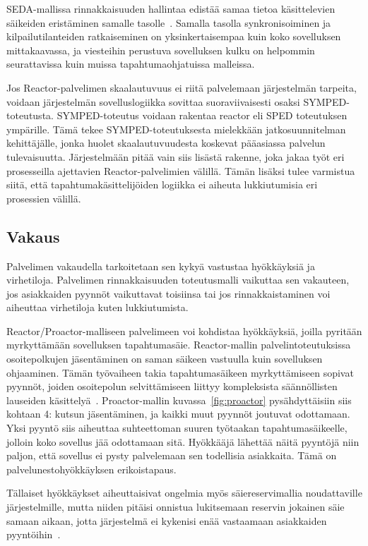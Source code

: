 \documentclass[finnish]{tktltiki2}
\theoremstyle{definition}
\theoremstyle{remark}
\begin{document}
SEDA-mallissa rinnakkaisuuden hallintaa edistää
samaa tietoa käsittelevien säikeiden eristäminen samalle tasolle~\cite{welsh_seda_2001}.
Samalla tasolla synkronisoiminen ja kilpailutilanteiden ratkaiseminen on
yksinkertaisempaa kuin koko sovelluksen mittakaavassa, ja
viesteihin perustuva sovelluksen kulku on helpommin seurattavissa kuin
muissa tapahtumaohjatuissa malleissa.

Jos Reactor-palvelimen skaalautuvuus ei riitä palvelemaan
järjestelmän tarpeita, voidaan järjestelmän sovelluslogiikka
sovittaa suoraviivaisesti osaksi SYMPED-toteutusta. SYMPED-toteutus
voidaan rakentaa reactor eli SPED toteutuksen ympärille. Tämä
tekee SYMPED-toteutuksesta mielekkään jatkosuunnitelman kehittäjälle,
jonka huolet skaalautuvuudesta koskevat pääasiassa palvelun tulevaisuutta.
Järjestelmään pitää vain siis lisästä rakenne, joka
jakaa työt eri prosesseilla ajettavien Reactor-palvelimien välillä.
Tämän lisäksi tulee varmistua siitä, että tapahtumakäsittelijöiden
logiikka ei aiheuta lukkiutumisia eri prosessien välillä.

\subsection{Vakaus}
Palvelimen vakaudella tarkoitetaan sen kykyä vastustaa hyökkäyksiä ja
virhetiloja.
Palvelimen rinnakkaisuuden toteutusmalli vaikuttaa sen vakauteen, jos asiakkaiden
pyynnöt vaikuttavat toisiinsa tai jos rinnakkaistaminen voi aiheuttaa virhetiloja kuten
lukkiutumista.

Reactor/Proactor-malliseen palvelimeen voi kohdistaa hyökkäyksiä, joilla pyritään
myrkyttämään sovelluksen tapahtumasäie. Reactor-mallin palvelintoteutuksissa
osoitepolkujen jäsentäminen on saman säikeen vastuulla kuin sovelluksen ohjaaminen.
Tämän työvaiheen takia
tapahtumasäikeen myrkyttämiseen sopivat pyynnöt,
joiden osoitepolun selvittämiseen liittyy kompleksista
säännöllisten lauseiden käsittelyä~\cite{davis_case_2017}.
Proactor-mallin kuvassa~\ref{fig:proactor} pysähdyttäisiin siis kohtaan 4: kutsun jäsentäminen, ja
kaikki muut pyynnöt joutuvat odottamaan.
Yksi pyyntö siis aiheuttaa suhteettoman suuren työtaakan
tapahtumasäikeelle, jolloin koko sovellus jää odottamaan sitä.
Hyökkääjä lähettää näitä pyyntöjä niin paljon, että sovellus
ei pysty palvelemaan sen todellisia asiakkaita. Tämä
on palvelunestohyökkäyksen erikoistapaus.

Tällaiset hyökkäykset aiheuttaisivat ongelmia myös säiereservimallia
noudattaville järjestelmille, mutta niiden pitäisi onnistua
lukitsemaan reservin jokainen säie samaan aikaan, jotta
järjestelmä ei kykenisi enää vastaamaan asiakkaiden pyyntöihin~\cite{davis_case_2017}.
\end{document}
